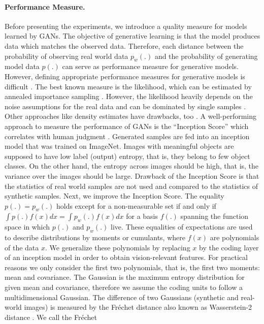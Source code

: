 \documentclass{article}
\begin{document}
\paragraph{Performance Measure.}
Before presenting the experiments, we introduce a quality measure
for models learned by GANs.
The objective of generative learning is that the model
produces data which matches the observed data.
Therefore, each distance between the probability of observing real world data
$p_w(.)$ and the probability of generating model data $p(.)$
can serve as performance measure for generative models.
However, defining appropriate
performance measures for generative models is difficult \cite{Theis:15}.
The best known measure is the likelihood,
which can be estimated by annealed importance sampling \cite{Wu:16}.
However, the likelihood heavily depends on the noise assumptions
for the real data and can be dominated by single samples \cite{Theis:15}.
Other approaches like density estimates have drawbacks, too \cite{Theis:15}.
A well-performing approach to measure the performance of GANs
is the ``Inception Score'' which correlates with human
judgment \cite{Salimans:16}.
Generated samples are fed into an inception model that was trained on
ImageNet. Images with meaningful objects are supposed to have low
label (output) entropy, that is, they belong to few object classes.
On the other hand, the entropy across images should be high, that is,
the variance over the images should be large.
Drawback of the Inception Score is that
the statistics of real world samples are not used and compared to
the statistics of synthetic samples.
Next, we improve the Inception Score.
The equality $p(.)=p_w(.)$ holds except for a non-measurable set
if and only if $\int p(.) f(x) dx=\int p_w(.) f(x) dx$ for
a basis $f(.)$ spanning the function space in which $p(.)$ and $p_w(.)$
live. These equalities of expectations are used to describe distributions
by moments or cumulants, where $f(x)$ are polynomials of the data $x$.
We generalize these polynomials by replacing $x$ by the coding layer of
an inception model in order to obtain vision-relevant features.
For practical reasons we only consider the first two polynomials, that
is, the first two moments: mean and covariance.
The Gaussian is the maximum entropy distribution for given
mean and covariance, therefore we assume the coding units to follow a
multidimensional Gaussian.
The difference of two Gaussians (synthetic and real-world images)
is measured by the Fr\'{e}chet
distance \cite{Frechet:57}
also known as Wasserstein-2 distance \cite{Wasserstein:69}.
We call the Fr\'{e}chet
\end{document}
